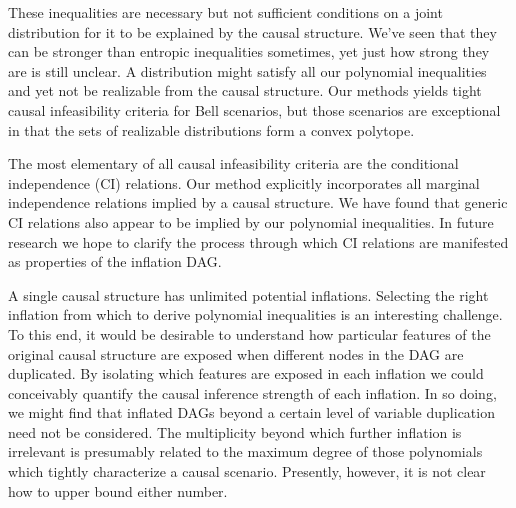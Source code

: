 These inequalities are necessary but not sufficient conditions on a joint distribution for it to be explained by the causal structure. We've seen that they can be stronger than entropic inequalities sometimes, yet just how strong they are is still unclear. A distribution might satisfy all our polynomial inequalities and yet not be realizable from the causal structure. %
Our methods yields tight causal infeasibility criteria for Bell scenarios, but those scenarios are exceptional in that the sets of realizable distributions form a convex polytope.

The most elementary of all causal infeasibility criteria are the conditional independence (CI) relations. Our method explicitly incorporates all marginal independence relations implied by a causal structure. We have found that generic CI relations also appear to be implied by our polynomial inequalities. In future research we hope to clarify the process through which CI relations are manifested as properties of the inflation DAG.

A single causal structure has unlimited potential inflations. Selecting the right inflation from which to derive polynomial inequalities is an interesting challenge. To this end, it would be desirable to understand how particular features of the original causal structure are exposed when different nodes in the DAG are duplicated. By isolating which features are exposed in each inflation we could conceivably quantify the causal inference strength of each inflation. In so doing, we might find that inflated DAGs beyond a certain level of variable duplication need not be considered. The multiplicity beyond which further inflation is irrelevant is presumably related to the maximum degree of those polynomials which tightly characterize a causal scenario. Presently, however, it is not clear how to upper bound either number.


